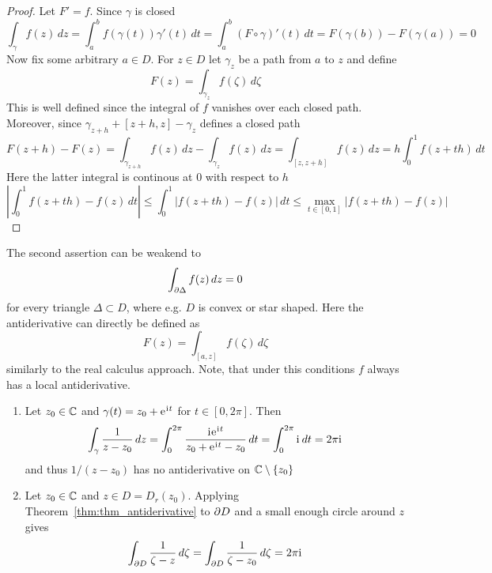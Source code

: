 \begin{definition}
\begin{proof} Let \( F' = f \). Since \( \gamma \) is closed
	\[
		\int_\gamma f(z)\,dz
			  = \int_a^b f(\gamma(t))\gamma'(t)\,dt 
			  = \int_a^b (F\circ\gamma)'(t)\,dt 
			  = F(\gamma(b)) - F(\gamma(a)) = 0
	\]
Now fix some arbitrary \( a \in D \). For \( z \in D \) let \( \gamma_z \) be a path from \( a \) to \( z \) 
and define
\[
	F(z) = \int_{\gamma_z} f(\zeta)\,d\zeta
\]
This is well defined since the integral of \( f \) vanishes over each closed path. Moreover, since
\( \gamma_{z + h} + [z + h,z] - \gamma_z \) defines a closed path
\[
	F(z + h) - F(z)
		= \int_{\gamma_{z + h}} f(z)\,dz - \int_{\gamma_z} f(z)\,dz
		= \int_{[z,z + h]} f(z)\,dz
		= h\int_0^1 f(z + th)\,dt
\]
Here the latter integral is continous at \( 0 \) with respect to \( h \)
\[
	\left|\int_0^1 f(z + th) - f(z)\,dt\right| 
		\le \int_0^1 |f(z + th) - f(z)|\,dt 
		\le \max_{t \in [0,1]}|f(z + th) - f(z)|
\]
\end{proof}
\bigskip


\begin{corollary}The second assertion can be weakend to 
\[
	\int_{\partial\Delta} f(z)\,dz = 0
\]
for every triangle \( \Delta \subset D\), where e.g. \( D \) is convex or star shaped. Here the antiderivative
can directly be defined as 
\[
	F(z) = \int_{[a,z]} f(\zeta)\,d\zeta
\]
similarly to the real calculus approach. Note, that under this conditions \( f \) always has a local antiderivative.
\end{corollary}
\bigskip


\begin{examples}\hfill
    \begin{enumerate}
        \item Let \( z_0 \in \mathbb{C} \) and \( \gamma(t) = z_0 + \mathrm{e}\mkern1mu^{\mathrm{i}\mkern1mu t} \) for \( t \in [0, 2\pi] \). Then
			\[
				\int_\gamma \frac{1}{z - z_0}\,dz 
					= \int_0^{2\pi} \frac{\mathrm{i}\mkern1mu \mathrm{e}\mkern1mu^{\mathrm{i}\mkern1mu t}}{z_0 + \mathrm{e}\mkern1mu^{\mathrm{i}\mkern1mu t} - z_0}\,dt
					= \int_0^{2\pi} \mathrm{i}\mkern1mu\,dt
					= 2\pi\mathrm{i}\mkern1mu
			\]
			and thus \( 1/ (z - z_0 ) \) has no antiderivative on \( \mathbb{C} \setminus \{z_0\} \)
        \item Let \( z_0 \in \mathbb{C} \) and \( z \in D = D_r(z_0) \). Applying Theorem~\ref{thm:thm_antiderivative} 
			to \( \partial D \) and a small enough circle around \( z \) gives
			\[
				\int_{\partial D} \frac{1}{\zeta - z}\,d\zeta
					= \int_{\partial D} \frac{1}{\zeta - z_0}\,d\zeta
					= 2\pi\mathrm{i}\mkern1mu
			\]
    \end{enumerate}
\end{examples}
\bigskip



\end{definition}
